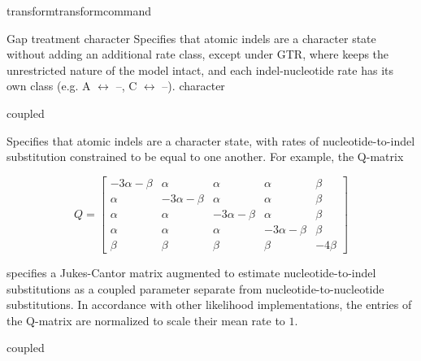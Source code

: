 \begin{command}{transform}{transformcommand}
\begin{arguments}
\begin {argumentgroup} {Gap treatment}
                  {\obligatory character}
                            {Specifies that atomic indels are a character state
                            without adding an additional rate class, except
                            under GTR, where \poy keeps the unrestricted nature of the
                            model intact, and each indel-nucleotide rate has its
                            own class (e.g. A $\leftrightarrow$ --, C $\leftrightarrow$ --).}
                            {character}
                            
        		   {\obligatory coupled}
                            {Specifies that atomic indels are a character state,
                            with rates of nucleotide-to-indel substitution
                            constrained to be equal to one another. For example,
                            the Q-matrix

                            \begin{equation*}
                                Q =
                                    \begin{bmatrix}
                                        -3 \alpha - \beta & \alpha & \alpha & \alpha & \beta \\
                                        \alpha & -3 \alpha - \beta & \alpha & \alpha & \beta \\
                                        \alpha & \alpha & -3 \alpha - \beta & \alpha & \beta \\
                                        \alpha & \alpha & \alpha & -3 \alpha - \beta & \beta \\
                                        \beta & \beta & \beta & \beta & -4 \beta
                                \end{bmatrix}
                            \end{equation*}

                            specifies a Jukes-Cantor matrix augmented to
                            estimate nucleotide-to-indel substitutions as a
                            coupled parameter separate from
                            nucleotide-to-nucleotide substitutions. In
                            accordance with other likelihood implementations,
                            the entries of the Q-matrix are normalized
                            to scale their mean rate to $ 1 $.}
                            {coupled}
                            

\end{argumentgroup}
\end{arguments}
\end{command}
